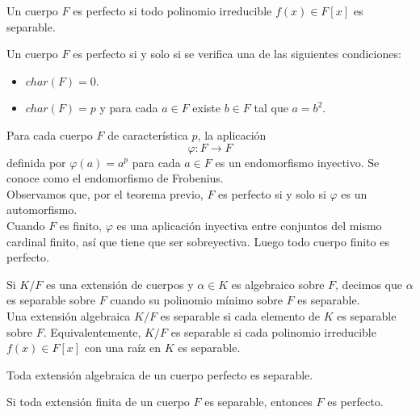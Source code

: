 \begin{definition}
    Un cuerpo $F$ es perfecto si todo polinomio irreducible $f(x) \in F[x]$ es separable.
\end{definition}

\begin{theorem}
    Un cuerpo $F$ es perfecto si y solo si se verifica una de las siguientes condiciones:
    \begin{itemize}
        \item $char(F) = 0$.
        \item $char(F) = p$ y para cada $a \in F$ existe $b \in F$ tal que $a = b^2$.
    \end{itemize}
\end{theorem}

\begin{remark}
    Para cada cuerpo $F$ de característica $p$, la aplicación
    $$\varphi : F \to F$$
    definida por $\varphi(a) = a^p$ para cada $a \in F$ es un endomorfismo inyectivo.
    Se conoce como el endomorfismo de Frobenius.\\
    Observamos que, por el teorema previo, $F$ es perfecto si y solo si $\varphi$ es un automorfismo.\\
    Cuando $F$ es finito, $\varphi$ es una aplicación inyectiva entre conjuntos del mismo cardinal finito, así que tiene que ser sobreyectiva.
    Luego todo cuerpo finito es perfecto.
\end{remark}

\begin{definition}
    Si $K/F$ es una extensión de cuerpos y $\alpha \in K$ es algebraico sobre $F$, decimos que $\alpha$ es separable sobre $F$ cuando su polinomio mínimo sobre $F$ es separable.\\
    Una extensión algebraica $K/F$ es separable si cada elemento de $K$ es separable sobre $F$.
    Equivalentemente, $K/F$ es separable si cada polinomio irreducible $f(x) \in F[x]$ con una raíz en $K$ es separable.
\end{definition}

\begin{proposition}
    Toda extensión algebraica de un cuerpo perfecto es separable.
\end{proposition}

\begin{proposition}
    Si toda extensión finita de un cuerpo $F$ es separable, entonces $F$ es perfecto.
\end{proposition}

